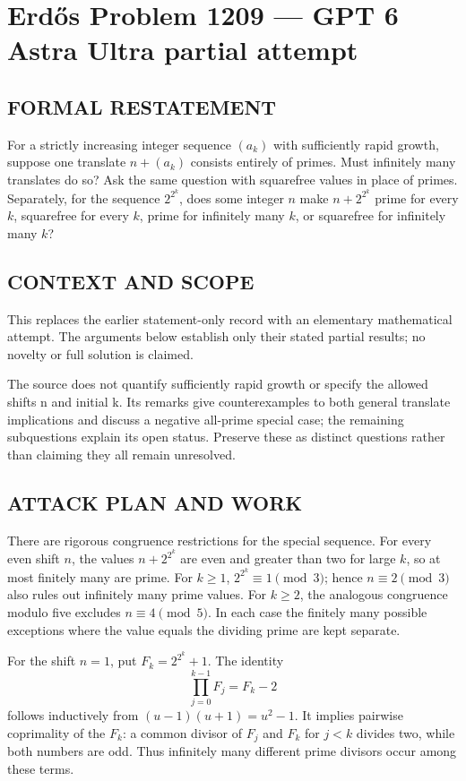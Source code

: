 \section*{Erd\H{o}s Problem 1209 --- GPT 6 Astra Ultra partial attempt}


\subsection*{FORMAL RESTATEMENT}
For a strictly increasing integer sequence $(a_k)$ with sufficiently rapid growth, suppose one translate $n+(a_k)$ consists entirely of primes. Must infinitely many translates do so? Ask the same question with squarefree values in place of primes. Separately, for the sequence $2^{2^k}$, does some integer $n$ make $n+2^{2^k}$ prime for every $k$, squarefree for every $k$, prime for infinitely many $k$, or squarefree for infinitely many $k$?

\subsection*{CONTEXT AND SCOPE}
This replaces the earlier statement-only record with an elementary mathematical attempt. The arguments below establish only their stated partial results; no novelty or full solution is claimed.

The source does not quantify sufficiently rapid growth or specify the allowed shifts n and initial k. Its remarks give counterexamples to both general translate implications and discuss a negative all-prime special case; the remaining subquestions explain its open status. Preserve these as distinct questions rather than claiming they all remain unresolved.

\subsection*{ATTACK PLAN AND WORK}
There are rigorous congruence restrictions for the special sequence. For every
even shift $n$, the values $n+2^{2^k}$ are even and greater than two for large
$k$, so at most finitely many are prime. For $k\ge1$,
$2^{2^k}\equiv1\pmod3$; hence $n\equiv2\pmod3$ also rules out infinitely many
prime values. For $k\ge2$, the analogous congruence modulo five excludes
$n\equiv4\pmod5$. In each case the finitely many possible exceptions where
the value equals the dividing prime are kept separate.

For the shift $n=1$, put $F_k=2^{2^k}+1$. The identity
\[\prod_{j=0}^{k-1}F_j=F_k-2\tag{1}\]
follows inductively from $(u-1)(u+1)=u^2-1$.
It implies pairwise coprimality of the $F_k$: a common divisor of $F_j$ and
$F_k$ for $j<k$ divides two, while both numbers are odd. Thus infinitely many
different prime divisors occur among these terms.

